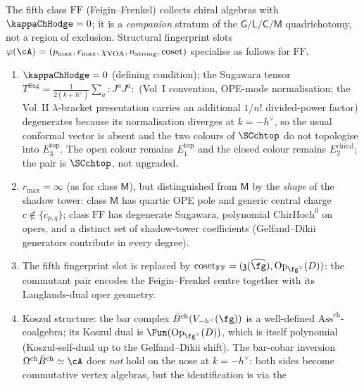 \begin{remark}%
\label{rem:class-FF-structural}%
%
%
The fifth class $\mathrm{FF}$ (Feigin--Frenkel) collects chiral algebras
with $\kappaChHodge=0$; it is a \emph{companion} stratum of the
$\mathsf{G}/\mathsf{L}/\mathsf{C}/\mathsf{M}$ quadrichotomy, not a region
of exclusion. Structural fingerprint slots
$\varphi(\cA)=(p_{\max},r_{\max},\chi_{\mathrm{VOA}},n_{\mathrm{strong}},\mathrm{coset})$
specialise as follows for $\mathrm{FF}$.
\begin{enumerate}[label=\textup{(\roman*)}]
\item $\kappaChHodge=0$ (defining condition); the Sugawara tensor
$T^{\mathrm{Sug}}=\frac{1}{2(k+h^\vee)}\sum_a{:}J^a J^a{:}$
(Vol~I convention, OPE-mode normalisation; the Vol~II $\lambda$-bracket
presentation carries an additional $1/n!$ divided-power factor)
degenerates because its normalisation diverges at $k=-h^\vee$, so the
usual conformal vector is
absent and the two colours of $\SCchtop$ do not topologise into
$E_3^{\mathrm{top}}$. The open colour remains $E_1^{\mathrm{top}}$ and
the closed colour remains $E_2^{\mathrm{chiral}}$; the pair is
$\SCchtop$, not upgraded.
\item $r_{\max}=\infty$ (as for class $\mathsf{M}$), but distinguished
from $\mathsf{M}$ by the \emph{shape} of the shadow tower: class
$\mathsf{M}$ has quartic OPE pole and generic central charge
$c\notin\{c_{p,q}\}$; class $\mathrm{FF}$ has degenerate Sugawara,
polynomial $\mathrm{ChirHoch}^0$ on opers, and a distinct set of
shadow-tower coefficients (Gelfand--Dikii generators contribute in
every degree).
\item The fifth fingerprint slot is replaced by
$\mathrm{coset}_{\mathrm{FF}}=(\mathfrak z(\widehat\fg),\mathrm{Op}_{\fg^\vee}(D))$:
the commutant pair encodes the Feigin--Frenkel centre together with its
Langlands-dual oper geometry.
\item Koszul structure: the bar complex
$\bar B^{\mathrm{ch}}(V_{-h^\vee}(\fg))$ is a well-defined
$\mathrm{Ass}^{\mathrm{ch}}$-coalgebra; its Koszul dual is
$\Fun(\mathrm{Op}_{\fg^\vee}(D))$, which is itself polynomial
(Koszul-self-dual up to the Gelfand--Dikii shift). The bar-cobar
inversion $\Omega^{\mathrm{ch}}\bar B^{\mathrm{ch}}\simeq\cA$ does
\emph{not} hold on the nose at $k=-h^\vee$: both sides become
commutative vertex algebras, but the identification is via the

\end{enumerate}
\end{remark}
